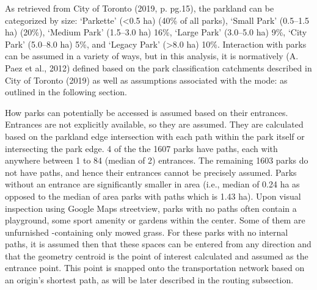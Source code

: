 \documentclass[
11pt, %
oneside, %
english, %
singlespacing, %
]{macthesis} %
\begin{document}
As retrieved from City of Toronto (2019, p. pg.15), the parkland can be categorized by size: `Parkette' (\textless0.5 ha) (40\% of all parks), `Small Park' (0.5--1.5 ha) (20\%), `Medium Park' (1.5--3.0 ha) 16\%, `Large Park' (3.0--5.0 ha) 9\%, `City Park' (5.0--8.0 ha) 5\%, and `Legacy Park' (\textgreater8.0 ha) 10\%. Interaction with parks can be assumed in a variety of ways, but in this analysis, it is normatively (A. Paez et al., 2012) defined based on the park classification catchments described in City of Toronto (2019) as well as assumptions associated with the mode: as outlined in the following section.

How parks can potentially be accessed is assumed based on their entrances. Entrances are not explicitly available, so they are assumed. They are calculated based on the parkland edge intersection with each path within the park itself or intersecting the park edge. 4 of the the 1607 parks have paths, each with anywhere between 1 to 84 (median of 2) entrances. The remaining 1603 parks do not have paths, and hence their entrances cannot be precisely assumed. Parks without an entrance are significantly smaller in area (i.e., median of 0.24 ha as opposed to the median of area parks with paths which is 1.43 ha). Upon visual inspection using Google Maps streetview, parks with no paths often contain a playground, some sport amenity or gardens within the center. Some of them are unfurnished -containing only mowed grass. For these parks with no internal paths, it is assumed then that these spaces can be entered from any direction and that the geometry centroid is the point of interest calculated and assumed as the entrance point. This point is snapped onto the transportation network based on an origin's shortest path, as will be later described in the routing subsection.
\end{document}
